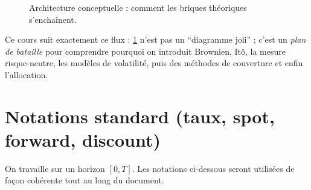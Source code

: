 \documentclass[11pt,a4paper]{report}
\newcommand{\1}{\mathbbm{1}}
\theoremstyle{definition}
\theoremstyle{plain}
\theoremstyle{remark}
\begin{document}
\begin{figure}[h!]
\centering
{}
\caption{Architecture conceptuelle : comment les briques théoriques s'enchaînent.}
\label{fig:pipeline_conceptuel}
\end{figure}

Ce cours suit exactement ce flux : \cref{fig:pipeline_conceptuel} n'est pas un ``diagramme joli'' ; c'est un
\emph{plan de bataille} pour comprendre pourquoi on introduit Brownien, Itô, la mesure risque-neutre, les modèles de volatilité,
puis des méthodes de couverture et enfin l'allocation.

\section{Notations standard (taux, spot, forward, discount)}
\label{sec:notations}

On travaille sur un horizon $[0,T]$. Les notations ci-dessous seront utilisées de façon cohérente tout au long du document.
\end{document}
